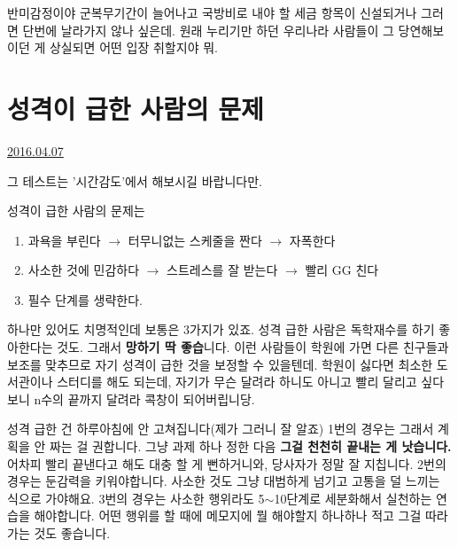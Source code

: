반미감정이야 군복무기간이 늘어나고 국방비로 내야 할 세금 항목이 신설되거나 그러면 단번에 날라가지 않나 싶은데.
원래 누리기만 하던 우리나라 사람들이 그 당연해보이던 게 상실되면 어떤 입장 취할지야 뭐.
\vspace{5mm}









\section{성격이 급한 사람의 문제}
\href{https://www.kockoc.com/Apoc/715622}{2016.04.07}

\vspace{5mm}

그 테스트는 '시간감도'에서 해보시길 바랍니다만.
\vspace{5mm}

성격이 급한 사람의 문제는
\vspace{5mm}
\begin{enumerate}
    \item 과욕을 부린다 $\rightarrow$ 터무니없는 스케줄을 짠다 $\rightarrow$ 자폭한다
    \item 사소한 것에 민감하다 $\rightarrow$ 스트레스를 잘 받는다 $\rightarrow$ 빨리 GG 친다
    \item 필수 단계를 생략한다.
\end{enumerate}
\vspace{5mm}

하나만 있어도 치명적인데 보통은 3가지가 있죠.
성격 급한 사람은 독학재수를 하기 좋아한다는 것도. 그래서 \textbf{망하기 딱 좋습}니다.
이런 사람들이 학원에 가면 다른 친구들과 보조를 맞추므로 자기 성격이 급한 것을 보정할 수 있을텐데.
학원이 싫다면 최소한 도서관이나 스터디를 해도 되는데,
자기가 무슨 달려라 하니도 아니고 빨리 달리고 싶다보니 n수의 끝까지 달려라 콕창이 되어버립니당.
\vspace{5mm}

성격 급한 건 하루아침에 안 고쳐집니다(제가 그러니 잘 알죠)
1번의 경우는 그래서 계획을 안 짜는 걸 권합니다. 그냥 과제 하나 정한 다음 \textbf{그걸 천천히 끝내는 게 낫습니다.}
어차피 빨리 끝낸다고 해도 대충 할 게 뻔하거니와, 당사자가 정말 잘 지칩니다.
2번의 경우는 둔감력을 키워야합니다.
사소한 것도 그냥 대범하게 넘기고 고통을 덜 느끼는 식으로 가야해요.
3번의 경우는 사소한 행위라도 5$\sim$10단계로 세분화해서 실천하는 연습을 해야합니다.
어떤 행위를 할 때에 메모지에 뭘 해야할지 하나하나 적고 그걸 따라가는 것도 좋습니다.
\vspace{5mm}

